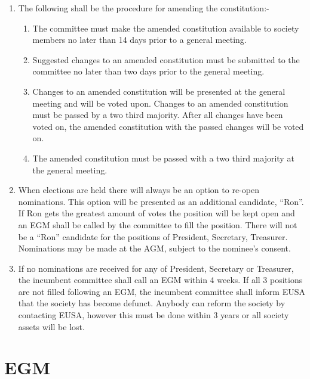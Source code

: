 \documentclass{article}
\begin{document}
\begin{enumerate}
  \item The following shall be the procedure for amending the constitution:-
    \begin{enumerate}
      \item The committee must make the amended constitution available to
        society members no later than 14 days prior to a general meeting.
      \item Suggested changes to an amended constitution must be submitted to
        the committee no later than two days prior to the general meeting.
      \item Changes to an amended constitution will be presented at the general
        meeting and will be voted upon. Changes to an amended constitution
        must be passed by a two third majority. After all changes have been
        voted on, the amended constitution with the passed changes will be
        voted on.
      \item The amended constitution must be passed with a two third majority
        at the general meeting.
    \end{enumerate}
    
  \item When elections are held there will always be an option to re-open nominations.
    This option will be presented as an additional candidate, “Ron”.
    If Ron gets the greatest amount of votes the position will be kept open
    and an EGM shall be called by the committee to fill the position. There
    will not be a “Ron” candidate for the positions of President, Secretary,
    Treasurer. Nominations may be made at the AGM, subject to the nominee's
    consent.

  \item If no nominations are received for any of President, Secretary or Treasurer,
    the incumbent committee shall call an EGM within 4 weeks. If all 3
    positions are not filled following an EGM, the incumbent committee shall
    inform EUSA that the society has become defunct. Anybody can reform
    the society by contacting EUSA, however this must be done within 3 years
    or all society assets will be lost.

\end{enumerate}





\newpage{}
\section{EGM}
\end{document}

